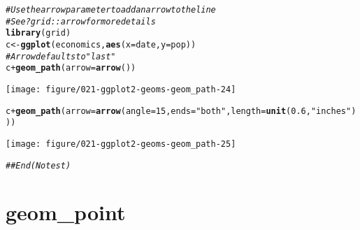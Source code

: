 \documentclass[a4paper,titlepage]{tufte-handout}\usepackage[]{graphicx}\usepackage[]{color}
\makeatletter
\def\maxwidth{ %
  \ifdim\Gin@nat@width>\linewidth
    \linewidth
  \else
    \Gin@nat@width
  \fi
}
\newcommand{\hlnum}[1]{\textcolor[rgb]{0.686,0.059,0.569}{#1}}%
\newcommand{\hlstr}[1]{\textcolor[rgb]{0.192,0.494,0.8}{#1}}%
\newcommand{\hlcom}[1]{\textcolor[rgb]{0.678,0.584,0.686}{\textit{#1}}}%
\newcommand{\hlopt}[1]{\textcolor[rgb]{0,0,0}{#1}}%
\newcommand{\hlstd}[1]{\textcolor[rgb]{0.345,0.345,0.345}{#1}}%
\newcommand{\hlkwb}[1]{\textcolor[rgb]{0.69,0.353,0.396}{#1}}%
\newcommand{\hlkwc}[1]{\textcolor[rgb]{0.333,0.667,0.333}{#1}}%
\newcommand{\hlkwd}[1]{\textcolor[rgb]{0.737,0.353,0.396}{\textbf{#1}}}%
\newenvironment{kframe}{%
 \def\at@end@of@kframe{}%
 \ifinner\ifhmode%
  \def\at@end@of@kframe{\end{minipage}}%
  \begin{minipage}{\columnwidth}%
 \fi\fi%
 \def\FrameCommand##1{\hskip\@totalleftmargin \hskip-\fboxsep
 \colorbox{shadecolor}{##1}\hskip-\fboxsep
     \hskip-\linewidth \hskip-\@totalleftmargin \hskip\columnwidth}%
 \MakeFramed {\advance\hsize-\width
   \@totalleftmargin\z@ \linewidth\hsize
   \@setminipage}}%
 {\par\unskip\endMakeFramed%
 \at@end@of@kframe}
\newenvironment{knitrout}{}{} %
\makeatother
\begin{document}
\begin{knitrout}
\begin{kframe}
\begin{alltt}
\hlcom{# Use the arrow parameter to add an arrow to the line}
\hlcom{# See ?grid::arrow for more details}
\hlkwd{library}\hlstd{(grid)}
\hlstd{c} \hlkwb{<-} \hlkwd{ggplot}\hlstd{(economics,} \hlkwd{aes}\hlstd{(}\hlkwc{x} \hlstd{= date,} \hlkwc{y} \hlstd{= pop))}
\hlcom{# Arrow defaults to "last"}
\hlstd{c} \hlopt{+} \hlkwd{geom_path}\hlstd{(}\hlkwc{arrow} \hlstd{=} \hlkwd{arrow}\hlstd{())}
\end{alltt}
\end{kframe}
\texttt{[image: figure/021-ggplot2-geoms-geom\_path-24]} 
\begin{kframe}\begin{alltt}
\hlstd{c} \hlopt{+} \hlkwd{geom_path}\hlstd{(}\hlkwc{arrow} \hlstd{=} \hlkwd{arrow}\hlstd{(}\hlkwc{angle} \hlstd{=} \hlnum{15}\hlstd{,} \hlkwc{ends} \hlstd{=} \hlstr{"both"}\hlstd{,} \hlkwc{length} \hlstd{=} \hlkwd{unit}\hlstd{(}\hlnum{0.6}\hlstd{,} \hlstr{"inches"}\hlstd{)))}
\end{alltt}
\end{kframe}
\texttt{[image: figure/021-ggplot2-geoms-geom\_path-25]} 
\begin{kframe}\begin{alltt}
\hlcom{## End(No test)}
\end{alltt}
\end{kframe}
\end{knitrout}


\section{geom\_point}
\end{document}

